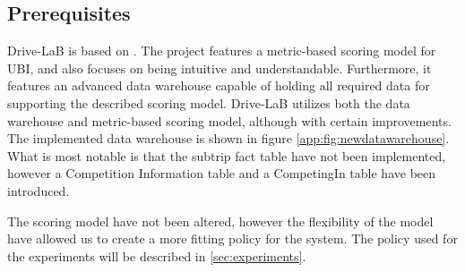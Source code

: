 \subsection{Prerequisites}\label{subsec:prereq}
Drive-LaB is based on \citep{sw9_report}. The project features a metric-based scoring model for UBI, and also focuses on being intuitive and understandable. Furthermore, it features an advanced data warehouse capable of holding all required data for supporting the described scoring model. Drive-LaB utilizes both the data warehouse and metric-based scoring model, although with certain improvements. The implemented data warehouse is shown in figure \ref{app:fig:newdatawarehouse}. What is most notable is that the subtrip fact table have not been implemented, however a Competition Information table and a CompetingIn table have been introduced.

The scoring model have not been altered, however the flexibility of the model have allowed us to create a more fitting policy for the system. The policy used for the experiments will be described in \ref{sec:experiments}.